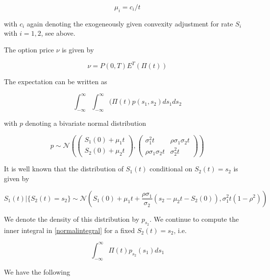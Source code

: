 \documentclass{amsart}
\theoremstyle{plain}
\numberwithin{equation}{section}
\begin{document}
\begin{equation}
\mu_i = c_i / t
\end{equation}

with $c_i$ again denoting the exogeneously given convexity adjustment for rate $S_i$ with $i=1,2$, see above.

The option price $\nu$ is given by

\begin{equation}
\nu = P(0,T) E^T \left( \Pi(t) \right)
\end{equation}

The expectation can be written as

\begin{equation}\label{normalintegral}
\int_{-\infty}^{\infty} \int_{-\infty}^{\infty} (\Pi(t) p(s_1,s_2) ds_1 ds_2
\end{equation}

with $p$ denoting a bivariate normal distribution

\begin{equation}
p \sim \mathcal{N}\left( \begin{pmatrix} S_1(0) + \mu_1t \\ S_2(0) + \mu_2t \end{pmatrix}, 
\begin{pmatrix} \sigma_1^2t & \rho\sigma_1\sigma_2t \\ \rho\sigma_1\sigma_2t & \sigma_2^2t \end{pmatrix} \right)
\end{equation}

It is well known that the distribution of $S_1(t)$ conditional on $S_2(t) = s_2$ is given by

\begin{equation}
S_1(t) | \{ S_2(t) = s_2 \} \sim \mathcal{N}\left( S_1(0) + \mu_1t + \frac{\rho\sigma_1}{\sigma_2}(s_2-\mu_2t-S_2(0)) , \sigma_1^2t (1-\rho^2)\right)
\end{equation}

We denote the density of this distribution by $p_{s_2}$. We continue to compute the inner integral in \ref{normalintegral} for a fixed $S_2(t) = s_2$, i.e.

\begin{equation}\label{innerintegral}
\int_{-\infty}^{\infty} \Pi(t) p_{s_2}(s_1) ds_1
\end{equation}

We have the following
\end{document}
